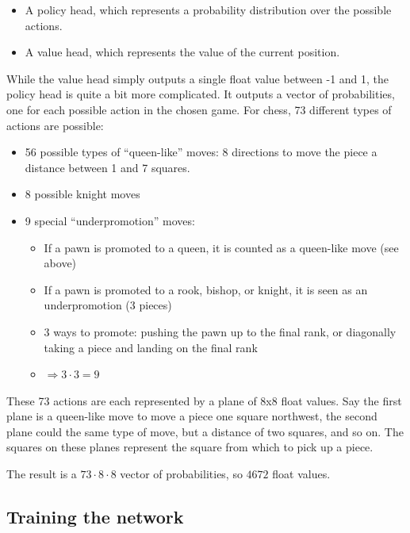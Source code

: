 \documentclass{article}
\begin{document}
\begin{itemize}
    \item A policy head, which represents a probability distribution over the possible actions.
    \item A value head, which represents the value of the current position.
\end{itemize}

While the value head simply outputs a single float value between -1 and 1, the policy head is quite a bit more complicated.
It outputs a vector of probabilities, one for each possible action in the chosen game. 
For chess, 73 different types of actions are possible:

\begin{itemize}
    \item 56 possible types of ``queen-like'' moves: 8 directions to move the piece a distance between 1 and 7 squares.
    \item 8 possible knight moves
    \item 9 special ``underpromotion'' moves:
    \begin{itemize}
        \item If a pawn is promoted to a queen, it is counted as a queen-like move (see above)
        \item If a pawn is promoted to a rook, bishop, or knight, it is seen as an underpromotion (3 pieces)
        \item 3 ways to promote: pushing the pawn up to the final rank, or diagonally taking a piece and landing on the final rank
        \item $\Rightarrow 3 \cdot 3 = 9$
    \end{itemize}
\end{itemize}

These 73 actions are each represented by a plane of 8x8 float values. Say the first plane is a queen-like move
to move a piece one square northwest, the second plane could the same type of move, but a distance of two squares, and so on.
The squares on these planes represent the square from which to pick up a piece. 


The result is a $73 \cdot 8 \cdot 8$ vector of probabilities, so $4672$ float values.  

\subsection{Training the network}
\end{document}
